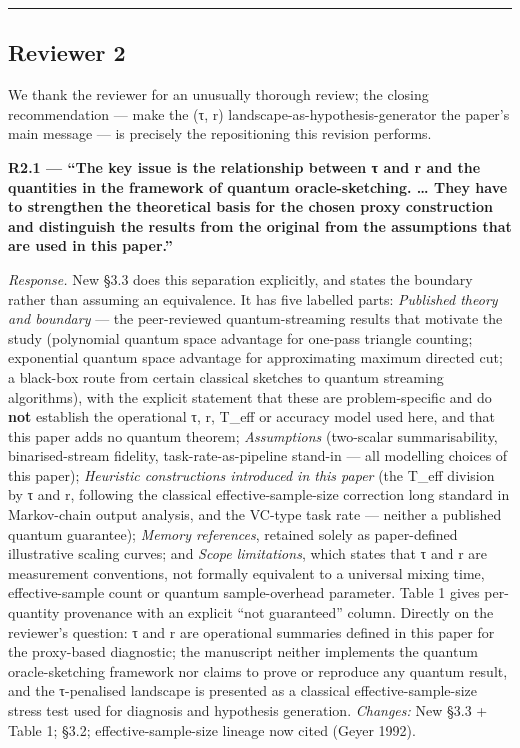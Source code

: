 \documentclass[
  11pt,
]{article}
\begin{document}
\begin{center}\rule{0.5\linewidth}{0.5pt}\end{center}

\subsection{Reviewer 2}\label{reviewer-2}

We thank the reviewer for an unusually thorough review; the closing
recommendation --- make the (τ, r) landscape-as-hypothesis-generator the
paper's main message --- is precisely the repositioning this revision
performs.

\textbf{R2.1 --- ``The key issue is the relationship between τ and r and
the quantities in the framework of quantum oracle-sketching. \ldots{}
They have to strengthen the theoretical basis for the chosen proxy
construction and distinguish the results from the original from the
assumptions that are used in this paper.''}

\emph{Response.} New §3.3 does this separation explicitly, and states
the boundary rather than assuming an equivalence. It has five labelled
parts: \emph{Published theory and boundary} --- the peer-reviewed
quantum-streaming results that motivate the study (polynomial quantum
space advantage for one-pass triangle counting; exponential quantum
space advantage for approximating maximum directed cut; a black-box
route from certain classical sketches to quantum streaming algorithms),
with the explicit statement that these are problem-specific and do
\textbf{not} establish the operational τ, r, T\_eff or accuracy model
used here, and that this paper adds no quantum theorem;
\emph{Assumptions} (two-scalar summarisability, binarised-stream
fidelity, task-rate-as-pipeline stand-in --- all modelling choices of
this paper); \emph{Heuristic constructions introduced in this paper}
(the T\_eff division by τ and r, following the classical
effective-sample-size correction long standard in Markov-chain output
analysis, and the VC-type task rate --- neither a published quantum
guarantee); \emph{Memory references}, retained solely as paper-defined
illustrative scaling curves; and \emph{Scope limitations}, which states
that τ and r are measurement conventions, not formally equivalent to a
universal mixing time, effective-sample count or quantum sample-overhead
parameter. Table 1 gives per-quantity provenance with an explicit ``not
guaranteed'' column. Directly on the reviewer's question: τ and r are
operational summaries defined in this paper for the proxy-based
diagnostic; the manuscript neither implements the quantum
oracle-sketching framework nor claims to prove or reproduce any quantum
result, and the τ-penalised landscape is presented as a classical
effective-sample-size stress test used for diagnosis and hypothesis
generation. \emph{Changes:} New §3.3 + Table 1; §3.2;
effective-sample-size lineage now cited (Geyer 1992).
\end{document}
